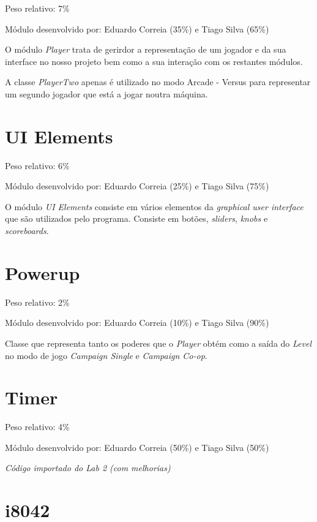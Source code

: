\documentclass{report}
\begin{document}
Peso relativo: 7\%

Módulo desenvolvido por: Eduardo Correia (35\%) e Tiago Silva (65\%) 
\newline

O módulo \textit{Player} trata de gerirdor a representação de um jogador e da sua interface no nosso projeto bem como a sua interação com os restantes módulos. 

A classe \textit{PlayerTwo} apenas é utilizado no modo Arcade - Versus para representar um segundo jogador que está a jogar noutra máquina. 

\section{UI Elements}

Peso relativo: 6\%

Módulo desenvolvido por: Eduardo Correia (25\%) e Tiago Silva (75\%) 
\newline

O módulo \textit{UI Elements} consiste em vários elementos da \textit{graphical user interface} que são utilizados pelo programa. Consiste em botões, \textit{sliders}, \textit{knobs} e \textit{scoreboards}.\footnotemark

\section{Powerup}

Peso relativo: 2\%

Módulo desenvolvido por: Eduardo Correia (10\%) e Tiago Silva (90\%)
\newline

Classe que representa tanto os poderes que o \textit{Player} obtém como a saída do \textit{Level} no modo de jogo \textit{Campaign Single} e \textit{Campaign Co-op}.

\section{Timer}

Peso relativo: 4\%

Módulo desenvolvido por: Eduardo Correia (50\%) e Tiago Silva (50\%)
\newline

\textit{Código importado do Lab 2 (com melhorias)}\footnotemark[\value{footnote}]

\section{i8042}
\end{document}
